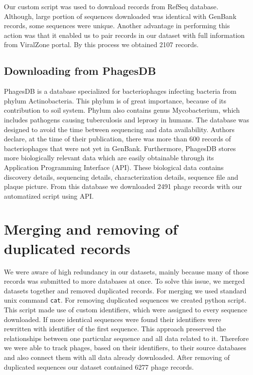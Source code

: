Our custom script was used to download records from RefSeq database.
Although, large portion of sequences downloaded was identical with GenBank records, some sequences were unique.
Another advantage in performing this action was that it enabled us to pair records in our dataset with full information from ViralZone portal.
By this process we obtained 2107 records. 


\subsection{Downloading from PhagesDB}
PhagesDB is a database specialized for bacteriophages infecting bacteria from phylum Actinobacteria.
This phylum is of great importance, because of its contribution to soil system.
Phylum also contains genus Mycobacterium, which includes pathogens causing tuberculosis and leprosy in humans.
The database was designed to avoid the time between sequencing and data availability.
Authors declare, at the time of their publication, there was more than 600 records of bacteriophages that were not yet in GenBank.
Furthermore, PhagesDB stores more biologically relevant data which are easily obtainable through its Application Programming Interface (API).
These biological data contains discovery details, sequencing details, characterization details, sequence file and plaque picture.
From this database we downloaded 2491 phage records with our automatized script using API.

\section{Merging and removing of duplicated records}
We were aware of high redundancy in our datasets, mainly because many of those records was submitted to more databases at once.
To solve this issue, we merged datasets together and removed duplicated records.
For merging we used standard unix command \verb|cat|.
For removing duplicated sequences we created python script.
This script made use of custom identifiers, which were assigned to every sequence downloaded.
If more identical sequences were found their identifiers were rewritten with identifier of the first sequence.
This approach preserved the relationships between one particular sequence and all data related to it.
Therefore we were able to track phages, based on their identifiers, to their source databases and also connect them with all data already downloaded.
After removing of duplicated sequences our dataset contained 6277 phage records.

